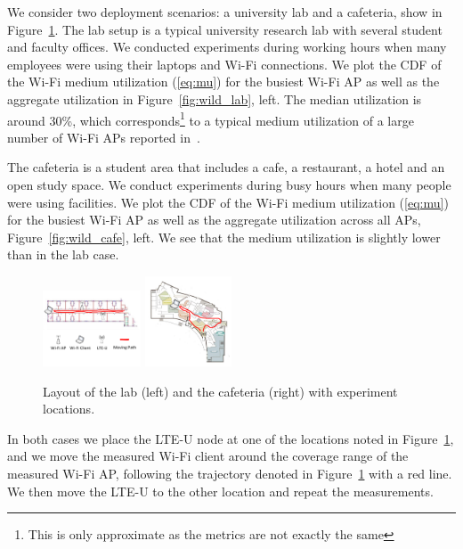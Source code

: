 We consider two deployment scenarios: a university lab and a cafeteria, show in Figure~\ref{fig:wild_layout}. The lab setup is a typical university research lab with several student and faculty offices. We conducted experiments during working hours when many employees were using their laptops and Wi-Fi connections. We plot the CDF of the Wi-Fi medium utilization (\ref{eq:mu}) for the busiest Wi-Fi AP as well as the aggregate utilization in Figure~\ref{fig:wild_lab}, left. 
The median utilization is around 30\%, which corresponds\footnote{This is only approximate as the metrics are not exactly the same} to a typical medium utilization of a large number of Wi-Fi APs reported in~\cite{meraki_sigcomm15}.

The cafeteria is a student area that includes a cafe, a restaurant, a hotel and an open study space. We conduct experiments during busy hours when many people were using facilities. We plot the CDF of the Wi-Fi medium utilization (\ref{eq:mu}) for the busiest Wi-Fi AP as well as the aggregate utilization across all APs, Figure~\ref{fig:wild_cafe}, left. We see that the medium utilization is slightly lower than in the lab case. 

\begin{figure}[h!]
\vspace{-12pt}
\hspace{-2pt}
    \includegraphics[width=0.26\textwidth]{./figures/floor_cs}
\hspace{-12pt}
    \includegraphics[width=0.23\textwidth]{./figures/floor_unionsouth}
\hspace{-24pt}
 \caption{Layout of the lab (left) and the cafeteria (right) with experiment locations.}
  \label{fig:wild_layout}
\end{figure}


In both cases we place the LTE-U node at one of the locations noted in Figure~\ref{fig:wild_layout}, and we move the measured Wi-Fi client around the coverage range of the measured Wi-Fi AP, following the trajectory denoted in Figure~\ref{fig:wild_layout} with a red line. We then move the LTE-U to the other location and repeat the measurements. 

